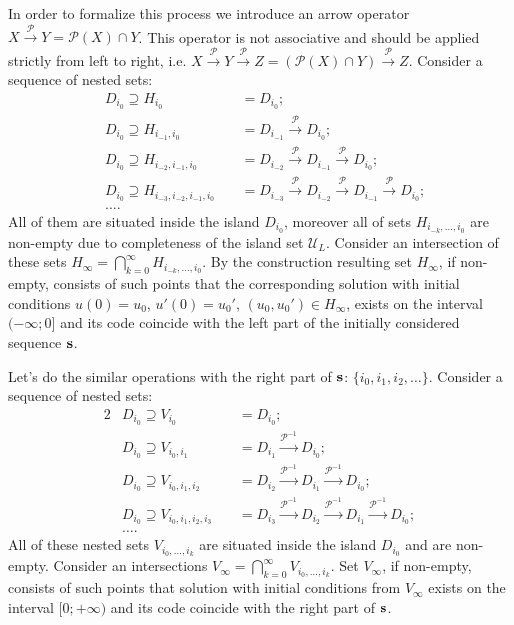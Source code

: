 In order to formalize this process we introduce an arrow operator $X \xrightarrow{\mathcal{P}} Y = \mathcal{P}(X) \cap Y$.
This operator is not associative and should be applied strictly from left to right, i.e. $X \xrightarrow{\mathcal{P}} Y \xrightarrow{\mathcal{P}} Z = (\mathcal{P}(X) \cap Y) \xrightarrow{\mathcal{P}} Z$.
Consider a sequence of nested sets:
\begin{equation}
	\begin{alignedat}{2}
		& D_{i_0} \supseteq H_{i_0} && \ = D_{i_0}; \\
		& D_{i_0} \supseteq H_{i_{-1}, i_0} && \ = D_{i_{-1}} \xrightarrow{\mathcal{P}} D_{i_0}; \\
		& D_{i_0} \supseteq H_{i_{-2}, i_{-1}, i_0} && \ = D_{i_{-2}} \xrightarrow{\mathcal{P}} D_{i_{-1}} \xrightarrow{\mathcal{P}} D_{i_0}; \\
		& D_{i_0} \supseteq H_{i_{-3}, i_{-2}, i_{-1}, i_0} && \ = D_{i_{-3}} \xrightarrow{\mathcal{P}} D_{i_{-2}} \xrightarrow{\mathcal{P}} D_{i_{-1}} \xrightarrow{\mathcal{P}} D_{i_0}; \\
		& \dots.
	\end{alignedat}
\label{eq:nested-h-sets}
\end{equation}
All of them are situated inside the island $D_{i_0}$, moreover all of sets $H_{i_{-k}, \dots, i_0}$ are non-empty due to completeness of the island set $\mathscr{U}_L$.
Consider an intersection of these sets $H_{\infty} = \bigcap_{k = 0}^{\infty} H_{i_{-k}, \dots, i_0}$.
By the construction resulting set $H_{\infty}$, if non-empty, consists of such points that the corresponding solution with initial conditions $u(0) = u_0$, $u'(0) = u_0'$, $(u_0, u_0') \in H_{\infty}$, exists on the interval $(-\infty; 0]$ and its code coincide with the left part of the initially considered sequence $\vb{s}$.

Let's do the similar operations with the right part of $\vb{s}$: $\{ i_0, i_1, i_2, \dots \}$.
Consider a sequence of nested sets:
\begin{alignat*}{2}
	& D_{i_0} \supseteq V_{i_0} && \ = D_{i_0}; \\
	& D_{i_0} \supseteq V_{i_0, i_1} && \ = D_{i_1} \xrightarrow{\mathcal{P}^{-1}} D_{i_0}; \\
	& D_{i_0} \supseteq V_{i_0, i_1, i_2} && \ = D_{i_2} \xrightarrow{\mathcal{P}^{-1}} D_{i_1} \xrightarrow{\mathcal{P}^{-1}} D_{i_0}; \\
	& D_{i_0} \supseteq V_{i_0, i_1, i_2, i_3} && \ = D_{i_3} \xrightarrow{\mathcal{P}^{-1}} D_{i_2} \xrightarrow{\mathcal{P}^{-1}} D_{i_1} \xrightarrow{\mathcal{P}^{-1}} D_{i_0}; \\
	& \dots.
\end{alignat*}
All of these nested sets $V_{i_0, \dots, i_k}$ are situated inside the island $D_{i_0}$ and are non-empty.
Consider an intersections $V_{\infty} = \bigcap_{k = 0}^{\infty} V_{i_0, \dots, i_k}$.
Set $V_{\infty}$, if non-empty, consists of such points that solution with initial conditions from $V_{\infty}$ exists on the interval $[0; +\infty)$ and its code coincide with the right part of $\vb{s}$.

